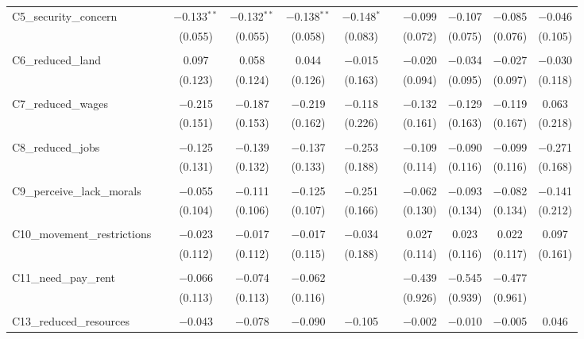 \begin{table}[H]
\begin{tabular}{@{\extracolsep{4pt}}lcccccccccc}
 C5\_security\_concern &  & $-$0.133$^{**}$ & $-$0.132$^{**}$ & $-$0.138$^{**}$ & $-$0.148$^{*}$ &  & $-$0.099 & $-$0.107 & $-$0.085 & $-$0.046 \\ 
  &  & (0.055) & (0.055) & (0.058) & (0.083) &  & (0.072) & (0.075) & (0.076) & (0.105) \\ 
  & & & & & & & & & & \\ 
 C6\_reduced\_land &  & 0.097 & 0.058 & 0.044 & $-$0.015 &  & $-$0.020 & $-$0.034 & $-$0.027 & $-$0.030 \\ 
  &  & (0.123) & (0.124) & (0.126) & (0.163) &  & (0.094) & (0.095) & (0.097) & (0.118) \\ 
  & & & & & & & & & & \\ 
 C7\_reduced\_wages &  & $-$0.215 & $-$0.187 & $-$0.219 & $-$0.118 &  & $-$0.132 & $-$0.129 & $-$0.119 & 0.063 \\ 
  &  & (0.151) & (0.153) & (0.162) & (0.226) &  & (0.161) & (0.163) & (0.167) & (0.218) \\ 
  & & & & & & & & & & \\ 
 C8\_reduced\_jobs &  & $-$0.125 & $-$0.139 & $-$0.137 & $-$0.253 &  & $-$0.109 & $-$0.090 & $-$0.099 & $-$0.271 \\ 
  &  & (0.131) & (0.132) & (0.133) & (0.188) &  & (0.114) & (0.116) & (0.116) & (0.168) \\ 
  & & & & & & & & & & \\ 
 C9\_perceive\_lack\_morals &  & $-$0.055 & $-$0.111 & $-$0.125 & $-$0.251 &  & $-$0.062 & $-$0.093 & $-$0.082 & $-$0.141 \\ 
  &  & (0.104) & (0.106) & (0.107) & (0.166) &  & (0.130) & (0.134) & (0.134) & (0.212) \\ 
  & & & & & & & & & & \\ 
 C10\_movement\_restrictions &  & $-$0.023 & $-$0.017 & $-$0.017 & $-$0.034 &  & 0.027 & 0.023 & 0.022 & 0.097 \\ 
  &  & (0.112) & (0.112) & (0.115) & (0.188) &  & (0.114) & (0.116) & (0.117) & (0.161) \\ 
  & & & & & & & & & & \\ 
 C11\_need\_pay\_rent &  & $-$0.066 & $-$0.074 & $-$0.062 &  &  & $-$0.439 & $-$0.545 & $-$0.477 &  \\ 
  &  & (0.113) & (0.113) & (0.116) &  &  & (0.926) & (0.939) & (0.961) &  \\ 
  & & & & & & & & & & \\ 
 C13\_reduced\_resources &  & $-$0.043 & $-$0.078 & $-$0.090 & $-$0.105 &  & $-$0.002 & $-$0.010 & $-$0.005 & 0.046 \\ 

\end{tabular}
\end{table}
